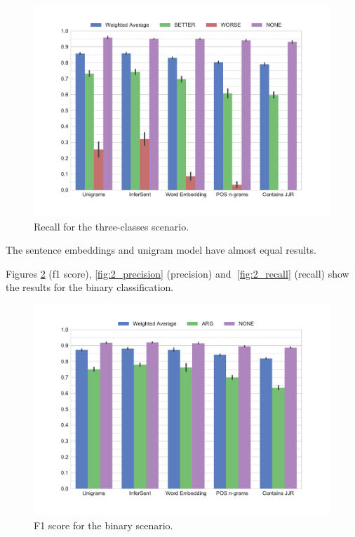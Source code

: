   \begin{figure}[ht]
     \caption{Recall for the three-classes scenario.} 
       \label{fig:3_recall}
 \centering
	\includegraphics[width=1\textwidth]{images/experiments/recall-False}
\end{figure}

The sentence embeddings and unigram model have almost equal results. 

Figures \ref{fig:2_f1} (f1 score), \ref{fig:2_precision} (precision) and \ref{fig:2_recall} (recall) show the results for the binary classification.

\begin{figure}[ht]
      \caption{F1 score for the binary scenario.} 
    \label{fig:2_f1}
 \centering
	\includegraphics[width=1\textwidth]{images/experiments/f1-True}

\end{figure}

